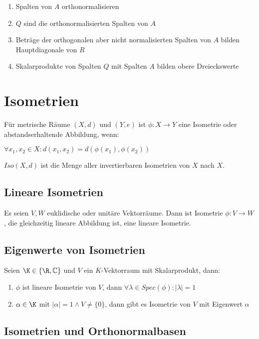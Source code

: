 \vspace*{-2mm}
\begin{enumerate}[leftmargin=4mm]
	\item Spalten von $A$ orthonormalisieren
	\item $Q$ sind die orthonormalisierten Spalten von $A$
	\item Beträge der orthogonalen aber nicht normalisierten Spalten von $A$ bilden Hauptdiagonale von $R$
	\item Skalarprodukte von Spalten $Q$ mit Spalten $A$ bilden obere Dreieckswerte
\end{enumerate}

\section*{Isometrien}

Für metrische Räume $(X, d)$ und $(Y, e)$ ist $\phi : X \rightarrow Y$ eine Isometrie oder abstandserhaltende Abbildung, wenn:

$\forall x_1, x_2 \in X : d(x_1, x_2) = d(\phi(x_1), \phi(x_2))$

$Iso(X, d)$ ist die Menge aller invertierbaren Isometrien von $X$ nach $X$.

\subsection*{Lineare Isometrien}

Es seien $V, W$ euklidische oder unitäre Vektorräume. Dann ist Isometrie $\phi : V \rightarrow W$, die gleichzeitig lineare Abbildung ist, eine lineare Isometrie.

\subsection*{Eigenwerte von Isometrien}

Seien $\K \in \{\R, \mathbb{C}\}$ und $V$ ein $K$-Vektorraum mit Skalarprodukt, dann:

\begin{enumerate}[label=(\alph*)]
	\item $\phi$ ist lineare Isometrie von $V$, dann $\forall \lambda \in Spec(\phi): |\lambda|=1$
	\item $\alpha \in \K$ mit $|\alpha|=1 \land V \neq \{0\}$, dann gibt es Isometrie von $V$ mit Eigenwert $\alpha$
\end{enumerate}

\subsection*{Isometrien und Orthonormalbasen}

